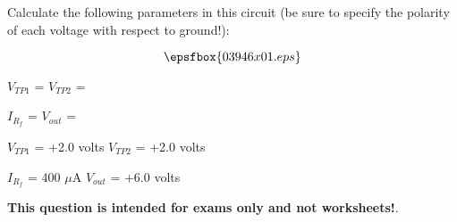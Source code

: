 

Calculate the following parameters in this circuit (be sure to specify the polarity of each voltage with respect to ground!):

$$\epsfbox{03946x01.eps}$$

$V_{TP1}$ = \hskip 80pt $V_{TP2}$ =

\vskip 10pt

$I_{R_f}$ = \hskip 80pt $V_{out}$ =







$V_{TP1}$ = +2.0 volts \hskip 50pt $V_{TP2}$ = +2.0 volts

\vskip 10pt

$I_{R_f}$ = 400 $\mu$A \hskip 50pt $V_{out}$ = +6.0 volts







{\bf This question is intended for exams only and not worksheets!}.




